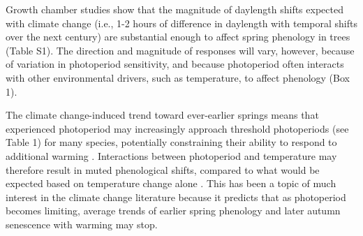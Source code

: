 \documentclass{article}
\begin{document}
\par Growth chamber studies show that the magnitude of daylength shifts expected with climate change (i.e., 1-2 hours of difference in daylength with temporal shifts over the next century) are substantial enough to affect spring phenology in trees (Table S1). The direction and magnitude of responses will vary, however, because of variation in photoperiod sensitivity, and because photoperiod often interacts with other environmental drivers, such as temperature, to affect phenology (Box 1). 

\par The climate change-induced trend toward ever-earlier springs means that experienced photoperiod may increasingly approach threshold photoperiods (see Table 1) for many species, potentially constraining their ability to respond to additional warming \citep{fu2019,vitasse2013,koerner2010a,Morin:2010aa,Nienstaedt:1966aa}. Interactions between photoperiod and temperature may therefore result in muted phenological shifts, compared to what would be expected based on temperature change alone \citep{koerner2010a,mimura2007,wareing1956}. This has been a topic of much interest in the climate change literature because it predicts that as photoperiod becomes limiting, average trends of earlier spring phenology \citep{polgar2013,penuelas2002,menzel2000} and later autumn senescence \citep{gill2015,richardson2018} with warming may stop. 
\end{document}
